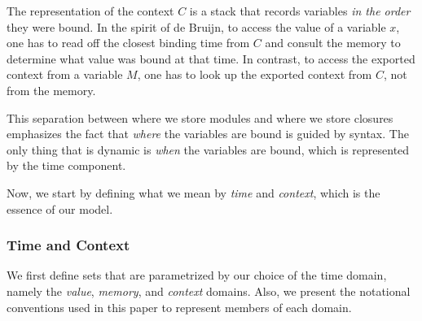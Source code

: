 \documentclass[acmsmall,review]{acmart}\settopmatter{printfolios=true,printccs=false,printacmref=false}
\theoremstyle{definition}
\begin{document}
The representation of the context $C$ is a stack that records variables \emph{in the order} they were bound.
In the spirit of de Bruijn, to access the value of a variable $x$, one has to read off the closest binding time from $C$ and consult the memory to determine what value was bound at that time.
In contrast, to access the exported context from a variable $M$, one has to look up the exported context from $C$, not from the memory.

This separation between where we store modules and where we store closures emphasizes the fact that \emph{where} the variables are bound is guided by syntax.
The only thing that is dynamic is \emph{when} the variables are bound, which is represented by the time component.

Now, we start by defining what we mean by \emph{time} and \emph{context}, which is the essence of our model.

\subsubsection{Time and Context}

We first define sets that are parametrized by our choice of the time domain, namely the \emph{value}, \emph{memory}, and \emph{context} domains.
Also, we present the notational conventions used in this paper to represent members of each domain.
\end{document}

